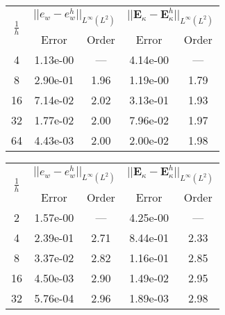 \begin{table}[hp]
	\centering
	\begin{tabular}{ccccc}
		\hline 
		\multirow{2}{*}{$\frac{1}{h}$} & \multicolumn{2}{c}{$||e_w - e_w^h||_{L^{\infty}(L^2)}$}  & \multicolumn{2}{c}{$||\bm{E}_\kappa - \bm{E}_\kappa^h||_{L^{\infty}(L^2)}$}   \\ 
		& Error & Order  & Error & Order  \\
		\hline 
		4  & 1.13e-00 & ---  & 4.14e-00 & ---  \\ 
		8  & 2.90e-01 & 1.96 & 1.19e-00 & 1.79 \\ 
		16 & 7.14e-02 & 2.02 & 3.13e-01 & 1.93 \\ 
		32 & 1.77e-02 & 2.00 & 7.96e-02 & 1.97 \\ 
		64 & 4.43e-03 & 2.00 & 2.00e-02 & 1.98 \\ 
		\hline 
	\end{tabular} 
	\captionsetup{width=0.95\linewidth}
	\vspace{1mm}
	\label{tab:reskirHHJ_CSFS_k2}
\end{table}

\begin{table}[hp]
	\centering
	\begin{tabular}{ccccc}
		\hline 
		\multirow{2}{*}{$\frac{1}{h}$} & \multicolumn{2}{c}{$||e_w - e_w^h||_{L^{\infty}(L^2)}$}  & \multicolumn{2}{c}{$||\bm{E}_\kappa - \bm{E}_\kappa^h||_{L^{\infty}(L^2)}$}   \\ 
		& Error & Order  & Error & Order  \\
		\hline 
		2  & 1.57e-00 & ---  & 4.25e-00 & ---  \\ 
		4  & 2.39e-01 & 2.71 & 8.44e-01 & 2.33 \\ 
		8  & 3.37e-02 & 2.82 & 1.16e-01 & 2.85 \\ 
		16 & 4.50e-03 & 2.90 & 1.49e-02 & 2.95 \\ 
		32 & 5.76e-04 & 2.96 & 1.89e-03 & 2.98 \\ 
		\hline 
	\end{tabular} 
	\captionsetup{width=0.95\linewidth}
	\vspace{1mm}
	\label{tab:reskirHHJ_CSFS_k3}
\end{table}

